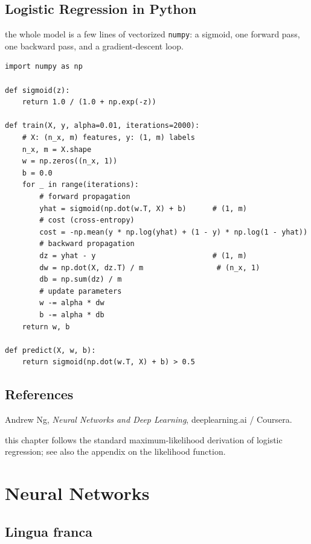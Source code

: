 \documentclass[4apaper,12pt]{book}
\begin{document}
\section{Logistic Regression in Python}
\begin{description}
\item the whole model is a few lines of vectorized \texttt{numpy}: a sigmoid, one forward pass, one backward pass, and a gradient-descent loop.
\end{description}
\begin{lstlisting}[caption={logistic regression with numpy}]
import numpy as np

def sigmoid(z):
    return 1.0 / (1.0 + np.exp(-z))

def train(X, y, alpha=0.01, iterations=2000):
    # X: (n_x, m) features, y: (1, m) labels
    n_x, m = X.shape
    w = np.zeros((n_x, 1))
    b = 0.0
    for _ in range(iterations):
        # forward propagation
        yhat = sigmoid(np.dot(w.T, X) + b)      # (1, m)
        # cost (cross-entropy)
        cost = -np.mean(y * np.log(yhat) + (1 - y) * np.log(1 - yhat))
        # backward propagation
        dz = yhat - y                           # (1, m)
        dw = np.dot(X, dz.T) / m                 # (n_x, 1)
        db = np.sum(dz) / m
        # update parameters
        w -= alpha * dw
        b -= alpha * db
    return w, b

def predict(X, w, b):
    return sigmoid(np.dot(w.T, X) + b) > 0.5
\end{lstlisting}

\section{References}
\begin{description}
\item Andrew Ng, \textit{Neural Networks and Deep Learning}, deeplearning.ai / Coursera.
\item this chapter follows the standard maximum-likelihood derivation of logistic regression; see also the appendix on the likelihood function.
\end{description}

\chapter{Neural Networks}
\section {Lingua franca}
\end{document}
